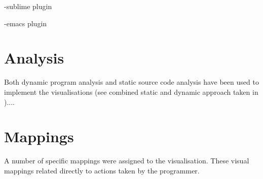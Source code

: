 -sublime plugin

-emacs plugin

\section{Analysis}

Both dynamic program analysis and static source code analysis have been used to implement the visualisations (see combined static and dynamic approach taken in \cite{Eisenbarth2003})....

\section{Mappings}

A number of specific mappings were assigned to the visualisation. These visual mappings related directly to actions taken by the programmer. 


